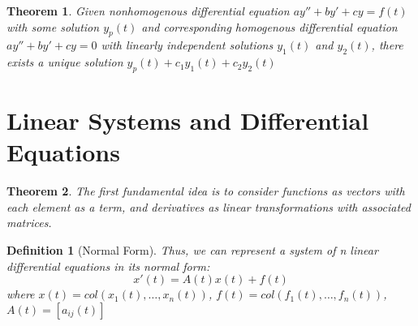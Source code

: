 \documentclass[12pt]{report}
\newtheorem{thm}{Theorem}
\newtheorem{dfn}{Definition}
\begin{document}
\begin{thm}
Given nonhomogenous differential equation $ay''+by'+cy=f(t)$ with some solution $y_p(t)$ and corresponding homogenous differential equation $ay''+by'+cy=0$ with linearly independent solutions $y_1(t)$ and $y_2(t)$, there exists a unique solution $y_p(t)+c_1y_1(t)+c_2y_2(t)$
\end{thm}

\section{Linear Systems and Differential Equations}

\begin{thm}
The first fundamental idea is to consider functions as vectors with each element as a term, and derivatives as linear transformations with associated matrices.
\end{thm}

\begin{dfn}[Normal Form]
Thus, we can represent a system of n linear differential equations in its normal form:
\begin{equation}
x'(t)=A(t)x(t)+f(t)
\end{equation}
where $x(t)=col(x_1(t),\ldots,x_n(t))$, $f(t)=col(f_1(t), \ldots, f_n(t))$, $A(t)=[a_{ij}(t)]$
\end{dfn}
\end{document}
